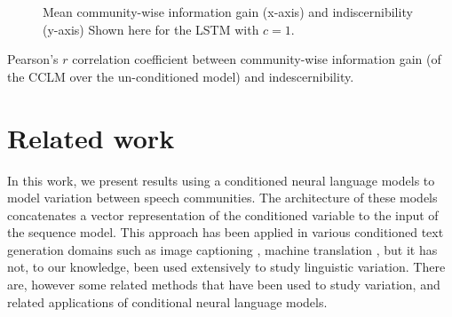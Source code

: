 \documentclass[11pt,a4paper]{article}
\begin{document}
\begin{figure}
  \caption{%
    Mean community-wise information gain (x-axis) 
    and indiscernibility (y-axis) 
    Shown here for the LSTM with $c = 1$.}
  \label{fig:cclm_lmcc_ppl}
\end{figure}

\begin{table}
  \centering
  
  \caption{
    Pearson's \(r\) correlation coefficient between community-wise information gain (of the CCLM over the un-conditioned model) and indescernibility.
  }
  \label{tab:lmcc_gain}
\end{table}





\section{Related work}

In this work, we present results using a conditioned neural language models
to model variation between speech communities.
The architecture of these models concatenates a vector representation
of the conditioned variable to the input of the sequence model.
This approach has been applied in various conditioned text generation domains such as 
image captioning \citep{Vinyals2015}, machine translation \citep{Kalchbrenner2013},
but it has not, to our knowledge, been used extensively to study linguistic variation.
There are, however some related methods that have been used to study variation,
and related applications of conditional neural language models.
\end{document}
